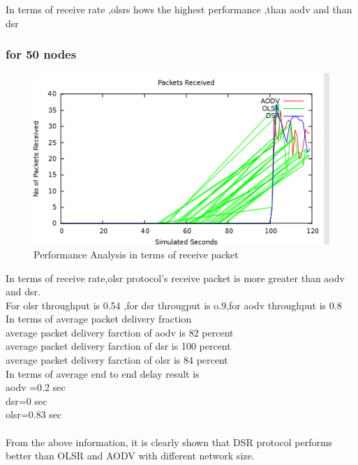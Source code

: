 \documentclass[12pt,a4paper]{report}
\begin{document}
In terms of receive rate ,olsrs hows the highest performance ,than aodv and than dsr
\newpage

\subsubsection{for 50 nodes}

\begin{figure}[hbtp]
\centering
\includegraphics[scale=.7]{packet2.png}
\caption{Performance Analysis in terms of receive packet}
\end{figure}

In terms of  receive rate,olsr protocol's receive packet is more greater than aodv and dsr.\\

For olsr throughput is 0.54 ,for dsr througput is o.9,for aodv throughput is 0.8\\

In terms of average packet delivery fraction \\
average packet delivery farction of aodv is 82 percent\\
average packet delivery farction of dsr is 100 percent\\
average packet delivery farction of olsr is 84 percent\\

In terms of average end to end delay result is\\
aodv =0.2 sec\\
dsr=0 sec\\
olsr=0.83 sec\\\\




From the above information, it is clearly shown that DSR protocol performs better than OLSR and AODV with different network size.
\end{document}

